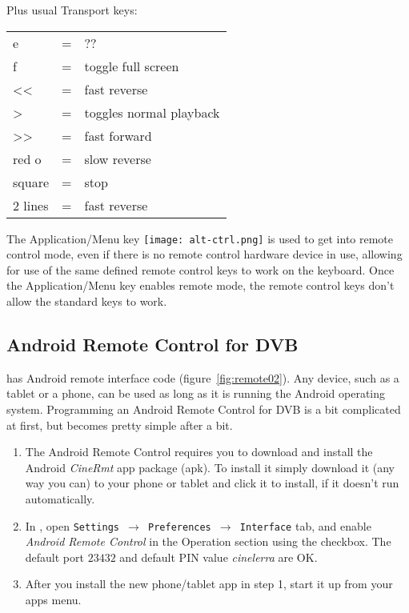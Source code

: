 \noindent Plus usual Transport keys:

\begin{tabular}{lcl}
	\toprule
    e&=&??\\
    
    f&=&toggle full screen\\
    
    <<&=&fast reverse\\
    
    >&=&toggles normal playback\\
    
    >>&=&fast forward\\
    
    red o&=&slow reverse\\
    
    square&=&stop\\
    
    2 lines&=&fast reverse\\
    \bottomrule   
\end{tabular}

The Application/Menu key  \quad
\texttt{[image: alt-ctrl.png]} \quad
is used to get into remote control mode, even if there is no remote control hardware device in use, allowing for use of the same defined remote control keys to work on the keyboard.  Once the Application/Menu key enables remote mode, the remote control keys don't allow the standard \CGG{} keys to work.

\subsection{Android Remote Control for DVB}%
\label{sub:android_remote_control_dvb}

\CGGI{} has Android remote interface code (figure~\ref{fig:remote02}). Any device, such as a tablet or a phone, can be used as long as it is running the Android operating system. Programming an Android Remote Control for DVB is a bit complicated at first, but becomes pretty simple after a bit.

\begin{enumerate}
    \item The Android Remote Control requires you to download and install the Android \textit{CineRmt} app package (apk). To install it simply download it (any way you can) to your phone or tablet and click it to install, if it doesn't run automatically.
    \item In \CGG{}, open \texttt{Settings $\rightarrow$ Preferences $\rightarrow$ Interface} tab, and enable \textit{Android Remote Control} in the Operation section using the checkbox. The default port $23432$ and default PIN value \textit{cinelerra} are OK.
    \item After you install the new phone/tablet app in step 1, start it up from your apps menu.
\end{enumerate}

